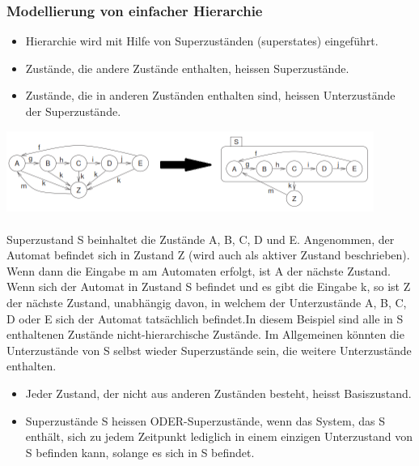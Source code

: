 \subsubsection{Modellierung von einfacher Hierarchie}
\begin{itemize}
  \item Hierarchie wird mit Hilfe von Superzuständen (superstates) eingeführt.
  \item Zustände, die andere Zustände enthalten, heissen Superzustände.
  \item Zustände, die in anderen Zuständen enthalten sind, heissen Unterzustände der Superzustände.
\end{itemize}
\includegraphics[width = 12cm]{images/FSM/Hierarchie}\\\\
Superzustand S beinhaltet die Zustände A, B, C, D und E. Angenommen, der Automat befindet sich in Zustand Z (wird auch als aktiver Zustand beschrieben). Wenn dann die Eingabe m am Automaten erfolgt, ist A der nächste Zustand. Wenn sich der Automat in Zustand S befindet und es gibt die Eingabe k, so ist Z der nächste Zustand, unabhängig davon, in welchem der Unterzustände A, B, C, D oder E sich der Automat tatsächlich befindet.In diesem Beispiel sind alle in S enthaltenen Zustände nicht-hierarchische Zustände. Im Allgemeinen könnten die Unterzustände von S selbst wieder Superzustände sein, die weitere Unterzustände enthalten.
\begin{itemize}
  \item Jeder Zustand, der nicht aus anderen Zuständen besteht, heisst Basiszustand.
  \item Superzustände S heissen ODER-Superzustände, wenn das System, das S enthält, sich zu jedem Zeitpunkt lediglich in einem einzigen Unterzustand von S befinden kann, solange es sich in S befindet.
\end{itemize}

